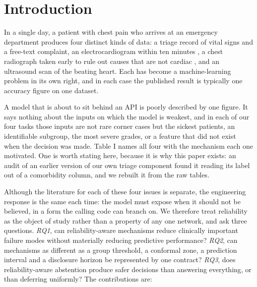 \documentclass[conference,a4paper]{IEEEtran}
\begin{document}
\section{Introduction}
In a single day, a patient with chest pain who arrives at an emergency department produces four distinct kinds of data: a triage record of vital signs and a free-text complaint, an electrocardiogram within ten minutes \cite{ref1}, a chest radiograph taken early to rule out causes that are not cardiac \cite{ref2}, and an ultrasound scan of the beating heart. Each has become a machine-learning problem in its own right, and in each case the published result is typically one accuracy figure on one dataset.

A model that is about to sit behind an API is poorly described by one figure. It says nothing about the inputs on which the model is weakest, and in each of our four tasks those inputs are not rare corner cases but the sickest patients, an identifiable subgroup, the most severe grades, or a feature that did not exist when the decision was made. Table I names all four with the mechanism each one motivated. One is worth stating here, because it is why this paper exists: an audit of an earlier version of our own triage component found it reading its label out of a comorbidity column, and we rebuilt it from the raw tables.

Although the literature for each of these four issues is separate, the engineering response is the same each time: the model must expose when it should not be believed, in a form the calling code can branch on. We therefore treat reliability as the object of study rather than a property of any one network, and ask three questions. \textit{RQ1}, can reliability-aware mechanisms reduce clinically important failure modes without materially reducing predictive performance? \textit{RQ2}, can mechanisms as different as a group threshold, a conformal zone, a prediction interval and a disclosure horizon be represented by one contract? \textit{RQ3}, does reliability-aware abstention produce safer decisions than answering everything, or than deferring uniformly? The contributions are:
\end{document}
